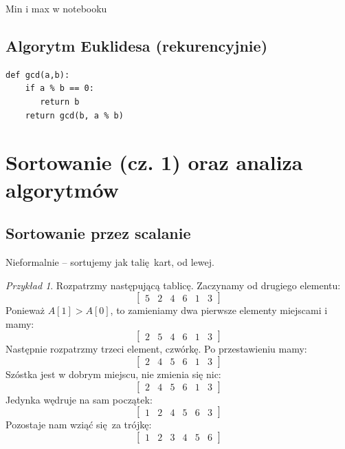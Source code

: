 \documentclass[10pt, oneside]{article}
\theoremstyle{remark}
\newtheorem*{example}{Przykład}
\begin{document}
Min i max w notebooku

\subsection{Algorytm Euklidesa (rekurencyjnie)}

\begin{verbatim}
def gcd(a,b):
    if a % b == 0:
       return b
    return gcd(b, a % b)
\end{verbatim}

\section{Sortowanie (cz. 1) oraz analiza algorytmów}

\subsection{Sortowanie przez scalanie}

Nieformalnie -- sortujemy jak talię kart, od lewej.

\begin{example}
Rozpatrzmy następującą tablicę. Zaczynamy od drugiego elementu:
$$\begin{bmatrix}
	5 & 2 & 4 & 6 & 1 & 3
\end{bmatrix}$$
Ponieważ $A[1] > A[0]$, to zamieniamy dwa pierwsze elementy miejscami i mamy:
$$\begin{bmatrix}
	2 & 5 & 4 & 6 & 1 & 3
\end{bmatrix}$$
Następnie rozpatrzmy trzeci element, czwórkę. Po przestawieniu mamy:
$$\begin{bmatrix}
	2 & 4 & 5 & 6 & 1 & 3
\end{bmatrix}$$
Szóstka jest w dobrym miejscu, nie zmienia się nic:
$$\begin{bmatrix}
	2 & 4 & 5 & 6 & 1 & 3
\end{bmatrix}$$
Jedynka wędruje na sam początek:
$$\begin{bmatrix}
	1 & 2 & 4 & 5 & 6 & 3
\end{bmatrix}$$
Pozostaje nam wziąć się za trójkę:
$$\begin{bmatrix}
	1 & 2 & 3 & 4 & 5 & 6
\end{bmatrix}$$
\end{example}
\end{document}
